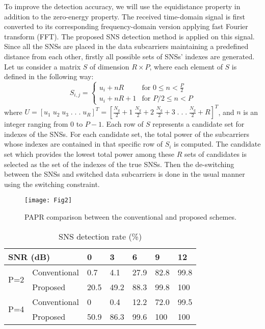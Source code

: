 \documentclass[journal,comsoc]{IEEEtran}
\begin{document}
   
   To improve the detection accuracy, we will use the equidistance property in addition to the zero-energy property. The received time-domain signal is first converted to its corresponding frequency-domain version applying fast Fourier transform (FFT). The proposed SNS detection method is applied on this signal. Since all the SNSs are placed in the data subcarriers maintaining a predefined distance from each other, firstly all possible sets of SNSs' indexes are generated. Let us consider a matrix $S$ of dimension $R\times P$, where each element of $S$ is defined in the following way:
 \begin{equation*}\label{eq.1}
  S_{i,j}=
  \begin{cases}
  u_i+nR & \text{for  $0\leq n<\frac{P}{2}$}\\
  u_i+nR+1 & \text{for $P/2\leq n< P$}
  \end{cases}
  \end{equation*}
 where $U=[u_1\;u_2\;u_3\;.\;.\;.\;u_R]^T=[\frac{N_g}{2}+1\;\frac{N_g}{2}+2\;\frac{N_g}{2}+3\;.\;.\;.\;\frac{N_g}{2}+R]^T$, and $n$ is an integer ranging from 0 to $P-1$. Each row of $S$ represents a candidate set for indexes of the SNSs. For each candidate set, the total power of the subcarriers whose indexes are contained in that specific row of $S_i$ is computed. The candidate set which provides the lowest total power among these $R$ sets of candidates is selected as the set of the indexes of the true SNSs. Then the de-switching between the SNSs and switched data subcarriers is done in the usual manner using the switching constraint.
\begin{figure}[!t]
\centering
\texttt{[image: Fig2]}
\caption{PAPR comparison between the conventional and proposed schemes.}
\label{fig2}
\end{figure}

\begin{table}[]
\centering
\caption{SNS detection rate (\%)}
\label{my-label}
\begin{tabular}{|l|l|l|l|l|l|l|}
\hline
\multicolumn{2}{|l|}{SNR (dB)} & 0 & 3 & 6 & 9 & 12 \\ \hline
\multirow{2}{*}{P=2}  & Conventional  & 0.7 & 4.1 & 27.9 & 82.8 & 99.8 \\  \cline{2-7}
                   & Proposed  & 20.5 & 49.2 & 88.3 & 99.8 & 100 \\ \hline
\multirow{2}{*}{P=4}  & Conventional  & 0 & 0.4 & 12.2 & 72.0 & 99.5 \\ \cline{2-7}
                   & Proposed  & 50.9 & 86.3 & 99.6 & 100 & 100 \\ \hline
\end{tabular}
\end{table}
\end{document}
